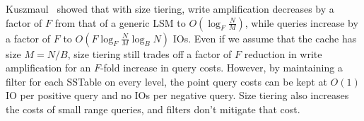 Kuszmaul~\cite{bradleywhitepaper} 
showed that with size tiering, write amplification decreases by a factor
of $F$ from that of a generic LSM to $O(\log_F
\frac{N}{M})$, while queries increase by a factor of $F$ to
$O(F \log_F \frac{N}{M} \log_B N)$ IOs.  Even if we assume
that the cache has size $M=N/B$, size tiering still trades off a
factor of $F$ reduction in write amplification for an
$F$-fold increase in query costs.  However, by maintaining a
filter for each SSTable on every level, the point query costs can be
kept at $O(1)$ IO per positive query and no IOs per negative query.
Size tiering also increases the costs of small range queries, and
filters don't mitigate that cost.






